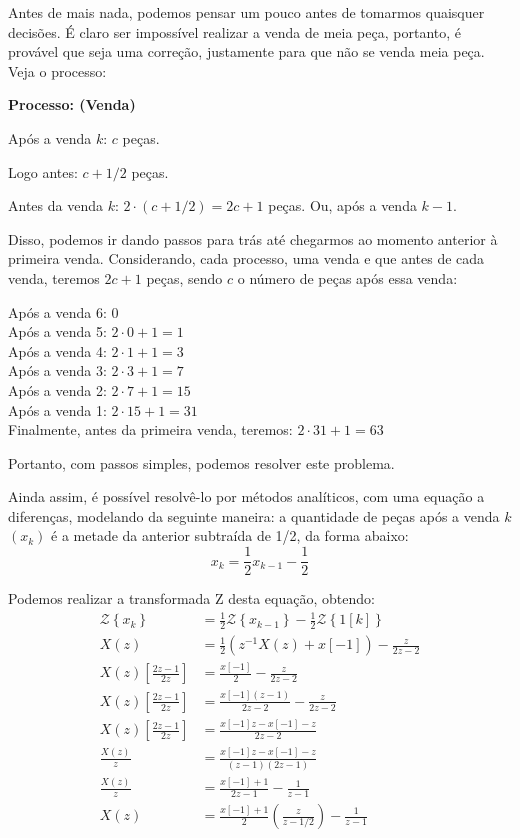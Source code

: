 \documentclass[10pt]{article}
\newcommand{\Z}[1]{\mathcal{Z}\left\{#1\right\}}
\begin{document}
Antes de mais nada, podemos pensar um pouco antes de tomarmos quaisquer decisões. É claro ser impossível realizar a venda de meia peça, portanto, é provável que seja uma correção, justamente para que não se venda meia peça. Veja o processo:

\textbf{Processo: (Venda)}

Após a venda $k$: $c$ peças.

Logo antes: $c + 1/2$ peças.

Antes da venda $k$: $2 \cdot (c + 1/2) = \boxed{2c + 1}$ peças. Ou, após a venda $k - 1$.

Disso, podemos ir dando passos para trás até chegarmos ao momento anterior à primeira venda. Considerando, cada processo, uma venda e que antes de cada venda, teremos $2c + 1$ peças, sendo $c$ o número de peças após essa venda:

Após a venda 6: 0\\
Após a venda 5: $2 \cdot 0 + 1 = 1$\\
Após a venda 4: $2 \cdot 1 + 1 = 3$\\
Após a venda 3: $2 \cdot 3 + 1 = 7$\\
Após a venda 2: $2 \cdot 7 + 1 = 15$\\
Após a venda 1: $2 \cdot 15 + 1 = 31$\\
Finalmente, antes da primeira venda, teremos: $2 \cdot 31 + 1 = 63$

Portanto, com passos simples, podemos resolver este problema.

Ainda assim, é possível resolvê-lo por métodos analíticos, com uma equação a diferenças, modelando da seguinte maneira: a quantidade de peças após a venda $k$ $(x_k)$ é a metade da anterior subtraída de 1/2, da forma abaixo:
\[x_k = \frac{1}{2}x_{k - 1} - \frac{1}{2}\]

Podemos realizar a transformada Z desta equação, obtendo:
\begin{align*}
    \Z{x_k} &= \frac{1}{2} \Z{x_{k - 1}} - \frac{1}{2} \Z{1[k]}\\
    X(z) &= \frac{1}{2} \left(z^{-1} X(z) + x[-1]\right) - \frac{z}{2z - 2}\\
    X(z) \left[\frac{2z - 1}{2z}\right] &= \frac{x[-1]}{2} - \frac{z}{2z - 2}\\
    X(z) \left[\frac{2z - 1}{2z}\right] &= \frac{x[-1](z - 1)}{2z - 2} - \frac{z}{2z - 2}\\
    X(z) \left[\frac{2z - 1}{2z}\right] &= \frac{x[-1]z - x[-1] - z}{2z - 2}\\
    \frac{X(z)}{z} &= \frac{x[-1]z - x[-1] - z}{(z - 1)(2z - 1)}\\
    \frac{X(z)}{z} &= \frac{x[-1] + 1}{2z - 1} - \frac{1}{z - 1}\\
    X(z) &= \frac{x[-1] + 1}{2} \left(\frac{z}{z - 1/2}\right) - \frac{1}{z - 1}
\end{align*}
\end{document}
